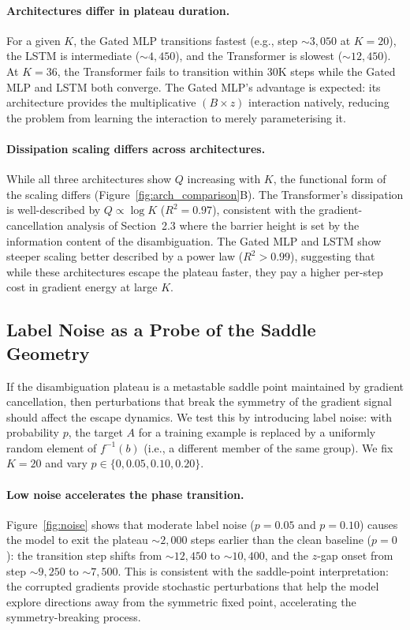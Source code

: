 \paragraph{Architectures differ in plateau duration.}
For a given $K$, the Gated MLP transitions fastest (e.g., step ${\sim}3{,}050$ at $K{=}20$), the LSTM is intermediate (${\sim}4{,}450$), and the Transformer is slowest (${\sim}12{,}450$). At $K{=}36$, the Transformer fails to transition within 30K steps while the Gated MLP and LSTM both converge. The Gated MLP's advantage is expected: its architecture provides the multiplicative $(B \times z)$ interaction natively, reducing the problem from learning the interaction to merely parameterising it.

\paragraph{Dissipation scaling differs across architectures.}
While all three architectures show $Q$ increasing with $K$, the functional form of the scaling differs (Figure~\ref{fig:arch_comparison}B). The Transformer's dissipation is well-described by $Q \propto \log K$ ($R^2 = 0.97$), consistent with the gradient-cancellation analysis of Section~2.3 where the barrier height is set by the information content of the disambiguation. The Gated MLP and LSTM show steeper scaling better described by a power law ($R^2 > 0.99$), suggesting that while these architectures escape the plateau faster, they pay a higher per-step cost in gradient energy at large $K$.

\subsection{Label Noise as a Probe of the Saddle Geometry}

If the disambiguation plateau is a metastable saddle point maintained by gradient cancellation, then perturbations that break the symmetry of the gradient signal should affect the escape dynamics. We test this by introducing label noise: with probability $p$, the target $A$ for a training example is replaced by a uniformly random element of $f^{-1}(b)$ (i.e., a different member of the same group). We fix $K{=}20$ and vary $p \in \{0, 0.05, 0.10, 0.20\}$.

\paragraph{Low noise accelerates the phase transition.}
Figure~\ref{fig:noise} shows that moderate label noise ($p = 0.05$ and $p = 0.10$) causes the model to exit the plateau ${\sim}2{,}000$ steps earlier than the clean baseline ($p{=}0$): the transition step shifts from ${\sim}12{,}450$ to ${\sim}10{,}400$, and the $z$-gap onset from step ${\sim}9{,}250$ to ${\sim}7{,}500$. This is consistent with the saddle-point interpretation: the corrupted gradients provide stochastic perturbations that help the model explore directions away from the symmetric fixed point, accelerating the symmetry-breaking process.

